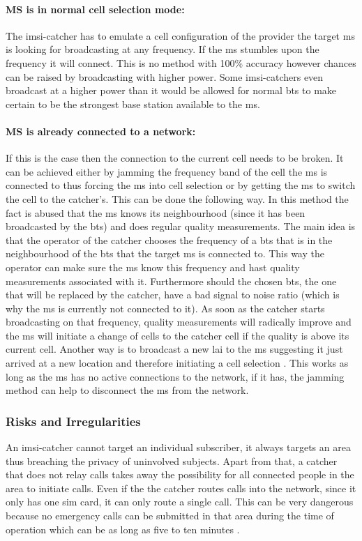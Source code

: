\paragraph{MS is in normal cell selection mode:}
The \gls{imsi}-catcher has to emulate a cell configuration of the provider the target \gls{ms} is looking for broadcasting at any frequency.
If the \gls{ms} stumbles upon the frequency it will connect.
This is no method with 100\% accuracy however chances can be raised by broadcasting with higher power.
Some \gls{imsi}-catchers even broadcast at a higher power than it would be allowed for normal \gls{bts} \cite{imsi_wiki} to make certain to be the strongest base station available to the \gls{ms}.

\paragraph{MS is already connected to a network:}
If this is the case then the connection to the current cell needs to be broken.
It can be achieved either by jamming the frequency band of the cell the \gls{ms} is connected to thus forcing the \gls{ms} into cell selection or by getting the \gls{ms} to switch the cell to the catcher's.
This can be done the following way.
In this method the fact is abused that the \gls{ms} knows its neighbourhood (since it has been broadcasted by the \gls{bts}) and does regular quality measurements.
The main idea is that the operator of the catcher chooses the frequency of a \gls{bts} that is in the neighbourhood of the \gls{bts} that the target \gls{ms} is connected to.
This way the operator can make sure the \gls{ms} know this frequency and hast quality measurements associated with it.
Furthermore should the chosen \gls{bts}, the one that will be replaced by the catcher, have a bad signal to noise ratio (which is why the \gls{ms} is currently not connected to it).
As soon as the catcher starts broadcasting on that frequency, quality measurements will radically improve and the \gls{ms} will initiate a change of cells to the catcher cell if the quality is above its current cell.
Another way is to broadcast a new \gls{lai} to the \gls{ms} suggesting it just arrived at a new location and therefore initiating a cell selection \cite{mueller}.
This works as long as the \gls{ms} has no active connections to the network, if it has, the jamming method can help to disconnect the \gls{ms} from the network.

\subsubsection{Risks and Irregularities}
An \gls{imsi}-catcher cannot target an individual subscriber, it always targets an area thus breaching the privacy of uninvolved subjects.
Apart from that, a catcher that does not relay calls takes away the possibility for all connected people in the area to initiate calls.
Even if the the catcher routes calls into the network, since it only has one \gls{sim} card, it can only route a single call.
This can be very dangerous because no emergency calls can be submitted in that area during the time of operation which can be as long as five to ten minutes \cite{fox}.

